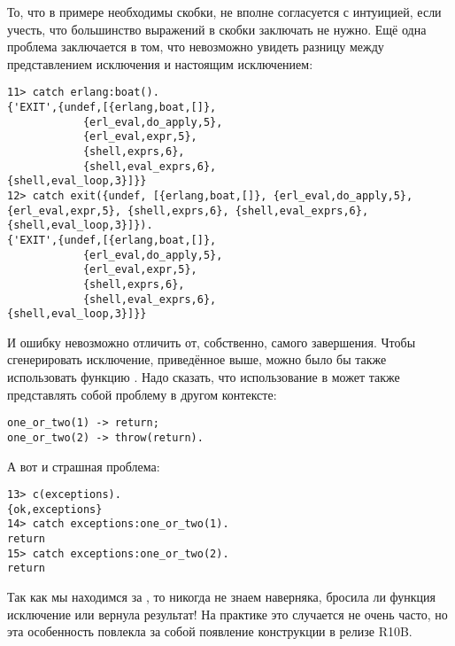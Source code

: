 То, что в примере необходимы скобки, не вполне согласуется с интуицией, если учесть, что большинство выражений в скобки заключать не нужно.
Ещё одна проблема заключается в том, что невозможно увидеть разницу между представлением исключения и настоящим исключением:
\begin{lstlisting}[style=erlang]
11> catch erlang:boat().
{'EXIT',{undef,[{erlang,boat,[]},
            {erl_eval,do_apply,5},
            {erl_eval,expr,5},
            {shell,exprs,6},
            {shell,eval_exprs,6},
{shell,eval_loop,3}]}}
12> catch exit({undef, [{erlang,boat,[]}, {erl_eval,do_apply,5}, {erl_eval,expr,5}, {shell,exprs,6}, {shell,eval_exprs,6}, {shell,eval_loop,3}]}).
{'EXIT',{undef,[{erlang,boat,[]},
            {erl_eval,do_apply,5},
            {erl_eval,expr,5},
            {shell,exprs,6},
            {shell,eval_exprs,6},
{shell,eval_loop,3}]}}
\end{lstlisting}

И ошибку невозможно отличить от, собственно, самого завершения.
Чтобы сгенерировать исключение, приведённое выше, можно было бы также использовать функцию .
Надо сказать, что использование  в  может также представлять собой проблему в другом контексте:
\begin{lstlisting}[style=erlang]
one_or_two(1) -> return;
one_or_two(2) -> throw(return).
\end{lstlisting}

А вот и страшная проблема:
\begin{lstlisting}[style=erlang]
13> c(exceptions).
{ok,exceptions}
14> catch exceptions:one_or_two(1).
return
15> catch exceptions:one_or_two(2).
return
\end{lstlisting}

Так как мы находимся за , то никогда не знаем наверняка, бросила ли функция исключение или вернула результат!
На практике это случается не очень часто, но эта особенность повлекла за собой появление конструкции  в релизе R10B.
